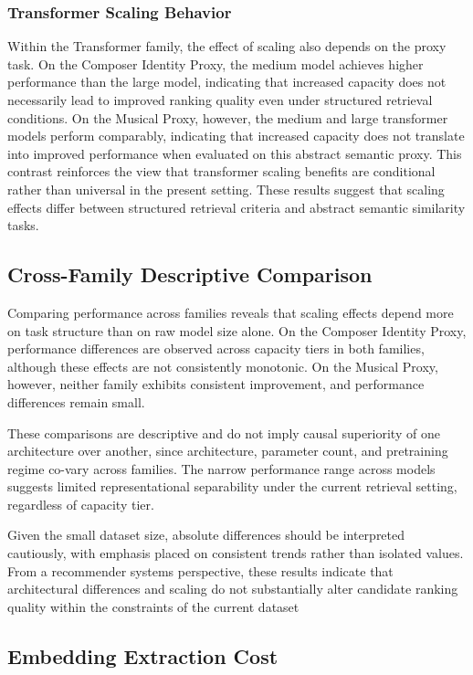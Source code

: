 \documentclass[sigconf]{acmart}
\begin{document}
\subsubsection{Transformer Scaling Behavior}

Within the Transformer family, the effect of scaling also depends on the proxy task. On the Composer Identity Proxy, the medium model achieves higher performance than the large model, indicating that increased capacity does not necessarily lead to improved ranking quality even under structured retrieval conditions. On the Musical Proxy, however, the medium and large transformer models perform comparably, indicating that increased capacity does not translate into improved performance when evaluated on this abstract semantic proxy. This contrast reinforces the view that transformer scaling benefits are conditional rather than universal in the present setting. These results suggest that scaling effects differ between structured retrieval criteria and abstract semantic similarity tasks.

\subsection{Cross-Family Descriptive Comparison}

Comparing performance across families reveals that scaling effects depend more on task structure than on raw model size alone. On the Composer Identity Proxy, performance differences are observed across capacity tiers in both families, although these effects are not consistently monotonic. On the Musical Proxy, however, neither family exhibits consistent improvement, and performance differences remain small.

These comparisons are descriptive and do not imply causal superiority of one architecture over another, since architecture, parameter count, and pretraining regime co-vary across families. The narrow performance range across models suggests limited representational separability under the current retrieval setting, regardless of capacity tier.

Given the small dataset size, absolute differences should be interpreted cautiously, with emphasis placed on consistent trends rather than isolated values. From a recommender systems perspective, these results indicate that architectural differences and scaling do not substantially alter candidate ranking quality within the constraints of the current dataset

\subsection{Embedding Extraction Cost}
\end{document}
